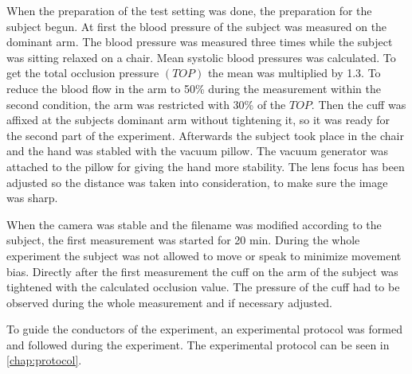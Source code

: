 When the preparation of the test setting was done, the preparation for the subject begun. At first the blood pressure of the subject was measured on the dominant arm. The blood pressure was measured three times while the subject was sitting relaxed on a chair. Mean systolic blood pressures was calculated. To get the total occlusion pressure $(TOP)$ the mean was multiplied by 1.3. To reduce the blood flow in the arm to 50\% during the measurement within the second condition, the arm was restricted with 30\% of the $TOP$.\cite{mouser2017} 
Then the cuff was affixed at the subjects dominant arm without tightening it, so it was ready for the second part of the experiment. Afterwards the subject took place in the chair and the hand was stabled with the vacuum pillow. The vacuum generator was attached to the pillow for giving the hand more stability. The lens focus has been adjusted so the distance was taken into consideration, to make sure the image was sharp.

When the camera was stable and the filename was modified according to the subject, the first measurement was started for 20 min. During the whole experiment the subject was not allowed to move or speak to minimize movement bias.
Directly after the first measurement the cuff on the arm of the subject was tightened with the calculated occlusion value. The pressure of the cuff had to be observed during the whole measurement and if necessary adjusted.

To guide the conductors of the experiment, an experimental protocol was formed and followed during the experiment. The experimental protocol can be seen in \cref{chap:protocol}. 

